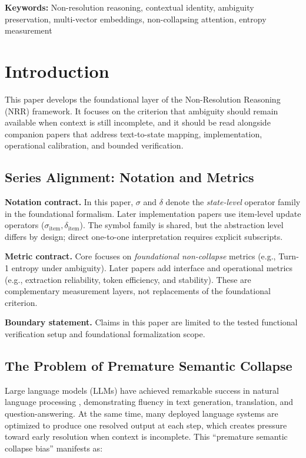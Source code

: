 \documentclass[11pt,a4paper]{article}
\begin{document}
\noindent\textbf{Keywords:} Non-resolution reasoning, contextual identity, ambiguity preservation, multi-vector embeddings, non-collapsing attention, entropy measurement

\section{Introduction}

This paper develops the foundational layer of the Non-Resolution Reasoning (NRR) framework. It focuses on the criterion that ambiguity should remain available when context is still incomplete, and it should be read alongside companion papers that address text-to-state mapping, implementation, operational calibration, and bounded verification.

\subsection{Series Alignment: Notation and Metrics}

\textbf{Notation contract.} In this paper, $\sigma$ and $\delta$ denote the
\emph{state-level} operator family in the foundational formalism. Later
implementation papers use item-level update operators
($\sigma_{\text{item}}, \delta_{\text{item}}$). The symbol family is shared, but
the abstraction level differs by design; direct one-to-one interpretation
requires explicit subscripts.

\textbf{Metric contract.} Core focuses on \emph{foundational non-collapse}
metrics (e.g., Turn-1 entropy under ambiguity). Later papers add interface and
operational metrics (e.g., extraction reliability, token efficiency, and
stability). These are complementary measurement layers, not replacements of the
foundational criterion.

\textbf{Boundary statement.} Claims in this paper are limited to the tested
functional verification setup and foundational formalization scope.

\subsection{The Problem of Premature Semantic Collapse}

Large language models (LLMs) have achieved remarkable success in natural language processing \cite{devlin2019bert, radford2018improving}, demonstrating fluency in text generation, translation, and question-answering.
At the same time, many deployed language systems are optimized to produce one resolved output at each step, which creates pressure toward early resolution when context is incomplete.
This ``premature semantic collapse bias'' manifests as:
\end{document}
